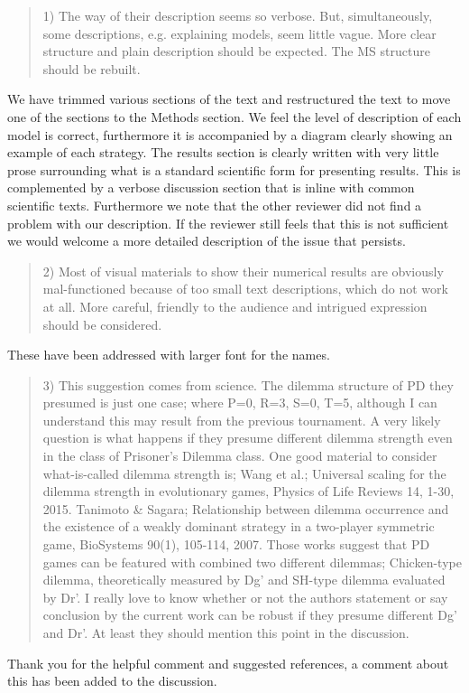 \documentclass[a4]{article}
\begin{document}
\begin{quote}
1) The way of their description seems so verbose. But, simultaneously, some
descriptions, e.g. explaining models, seem little vague. More clear structure
and plain description should be expected. The MS structure should be rebuilt.
\end{quote}

We have trimmed various sections of the text and restructured the text to move
one of the sections to the Methods section. We feel the level of description of
each model is correct, furthermore it is accompanied by a diagram clearly
showing an example of each strategy. The results section is clearly written with
very little prose surrounding what is a standard scientific form for presenting
results. This is complemented by a verbose discussion section that is inline
with common scientific texts. Furthermore we note that the other reviewer did
not find a problem with our description. If the reviewer still feels that this
is not sufficient we would welcome a more detailed description of the issue that
persists.

\begin{quote}
2) Most of visual materials to show their numerical results are obviously mal-functioned because of too small text descriptions, which do not work at all. More careful, friendly to the audience and intrigued expression should be considered.
\end{quote}

These have been addressed with larger font for the names.

\begin{quote}
3) This suggestion comes from science. The dilemma structure of PD they presumed is just one case; where P=0, R=3, S=0, T=5, although I can understand this may result from the previous tournament. A very likely question is what happens if they presume different dilemma strength even in the class of Prisoner’s Dilemma class. One good material to consider what-is-called dilemma strength is;
Wang et al.; Universal scaling for the dilemma strength in evolutionary games, Physics of Life Reviews 14, 1-30, 2015.
Tanimoto \& Sagara; Relationship between dilemma occurrence and the existence of a weakly dominant strategy in a two-player symmetric game, BioSystems 90(1), 105-114, 2007.
Those works suggest that PD games can be featured with combined two different dilemmas; Chicken-type dilemma, theoretically measured by Dg’ and SH-type dilemma evaluated by Dr’. I really love to know whether or not the authors statement or say conclusion by the current work can be robust if they presume different Dg’ and Dr’. At least they should mention this point in the discussion.
\end{quote}

Thank you for the helpful comment and suggested references, a comment about this
has been added to the discussion.
\end{document}
